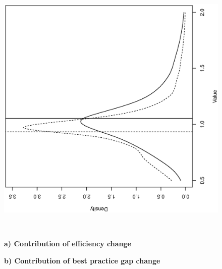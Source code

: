 \documentclass[11pt,a4paper,oneside]{article}
\begin{document}
\begin{figure}[htbp]
\begin{minipage}[c]{0.30\textwidth}
  \begin{turn}{-90}
  \includegraphics[width=\textwidth,height=1.0\textwidth]{Direction.1/gml_EC_gml_EC_BPC_DEA_locfit_2009-2013.ps}
  \end{turn}
  \end{minipage}\\
  
  \begin{minipage}[c]{0.30\textwidth}
  \centering
  {\bf \footnotesize a) Contribution of efficiency change}
\end{minipage}
%
  \begin{minipage}[c]{0.30\textwidth}
  \centering
  {\bf \footnotesize b) Contribution of best practice gap change}  
\end{minipage}
  
  
  

\end{figure}
\end{document}
